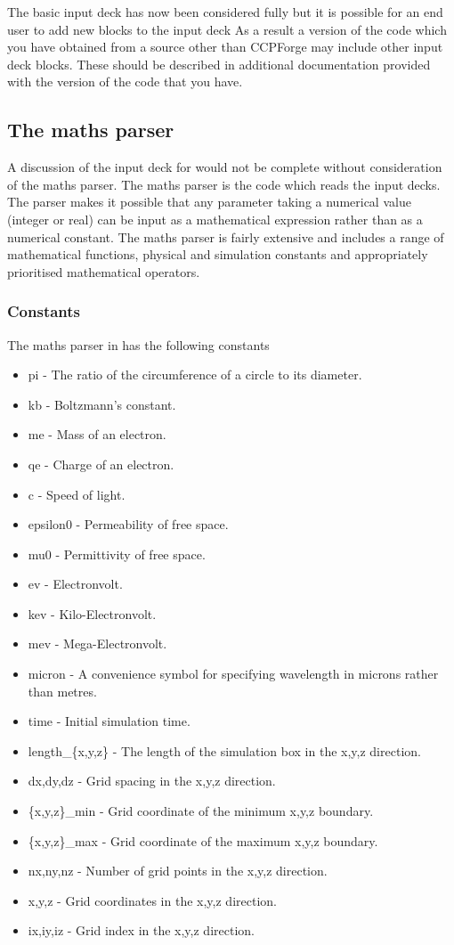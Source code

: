 The basic input deck has now been considered fully but it
 is possible for an end user to add new blocks to the input deck As a result
a version of the code which you have obtained from a source other than
CCPForge may include other input deck blocks. These should be described in
additional documentation provided with the version of the code that you have.

\subsection{The maths parser}
\label{sec:maths_parser}
A discussion of the input deck for {\EPOCH} would not be complete without
consideration of the maths parser. The maths parser is the code which reads
the input decks.
The parser makes it possible that any parameter taking a
numerical value (integer or real) can be input as a mathematical expression
rather than as a numerical constant. The maths parser is fairly extensive and
includes a range of mathematical functions, physical and simulation constants
and appropriately prioritised mathematical operators.


\subsubsection{Constants}
\label{sec:constants}
The maths parser in {\EPOCH}  has the following constants
\begin{itemize}
\item pi - The ratio of the circumference of a circle to its diameter.
\item kb - Boltzmann's constant.
\item me - Mass of an electron.
\item qe - Charge of an electron.
\item c - Speed of light.
\item epsilon0 - Permeability of free space.
\item mu0 - Permittivity of free space.
\item ev - Electronvolt.
\item kev - Kilo-Electronvolt.
\item mev - Mega-Electronvolt.
\item micron - A convenience symbol for specifying wavelength in microns
rather than metres.
\item time - Initial simulation time.
\item length\_\{x,y,z\} - The length of the simulation box in the x,y,z
  direction.
\item dx,dy,dz - Grid spacing in the x,y,z direction.
\item \{x,y,z\}\_min - Grid coordinate of the minimum x,y,z boundary.
\item \{x,y,z\}\_max - Grid coordinate of the maximum x,y,z boundary.
\item nx,ny,nz - Number of grid points in the x,y,z direction.
\item x,y,z - Grid coordinates in the x,y,z direction.
\item ix,iy,iz - Grid index in the x,y,z direction.
\end{itemize}

